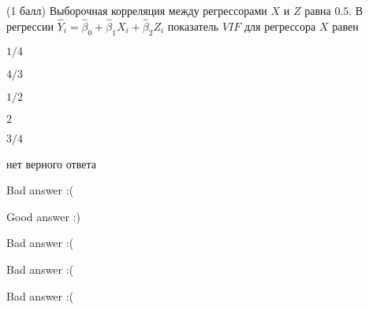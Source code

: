 
\begin{question}
(1 балл) Выборочная корреляция между регрессорами \(X\) и \(Z\) равна \(0.5\). В
регрессии \(\hat Y_i = \hat\beta_0 + \hat\beta_1 X_i + \hat\beta_2 Z_i\)
показатель \(VIF\) для регрессора \(X\) равен
\begin{answerlist}
  \item \(1/4\)
  \item \(4/3\)
  \item \(1/2\)
  \item \(2\)
  \item \(3/4\)
  \item нет верного ответа
\end{answerlist}
\end{question}

\begin{solution}
\begin{answerlist}
  \item Bad answer :(
  \item Good answer :)
  \item Bad answer :(
  \item Bad answer :(
  \item Bad answer :(
\end{answerlist}
\end{solution}
